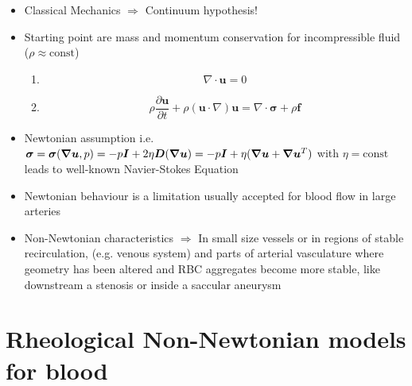 \documentclass{beamer}
\begin{document}
	
	    \begin{frame}
	    \begin{itemize}
	        \item        Classical Mechanics
			    $\Rightarrow$ Continuum hypothesis!
			    \item Starting point are mass and momentum conservation for incompressible fluid ($\rho \approx \text{const}$) 
	    \begin{enumerate}
			    \item \begin{equation*}
			         \nabla \cdot \bm{u} = 0
			    \end{equation*}
			      \item \begin{equation*}
			         \rho  \frac{\partial \bm{u}}{\partial t} + \rho (\bm{u} \cdot \nabla) \bm{u} =  \nabla \cdot \bm{\sigma} + \rho\bm{f}
			    \end{equation*}
			    \end{enumerate}	
			    \vspace{5pt}
			    \item Newtonian assumption i.e. $
    \bm{\sigma} = \bm{\sigma}(\grad\bm{u},p)= -p\bm{I} +2\eta\bm{D}(\grad\bm{u})= -p\bm{I} + \eta(\grad\bm{u}+\grad\bm{u}^T)$
    with $\eta = \text{const}$ leads to well-known Navier-Stokes Equation
	    \end{itemize}
		    \end{frame}

	
	    \begin{frame}
	    \begin{itemize}
        \item Newtonian behaviour is a limitation usually accepted for blood flow in large arteries
        \item Non-Newtonian
characteristics $\Rightarrow$ In small size vessels or in regions of stable recirculation, (e.g. venous system) and parts of  arterial vasculature where geometry has been altered and RBC aggregates become more stable,
like downstream a stenosis or inside a saccular aneurysm
	    \end{itemize}
		    \end{frame}
	
	\section[Non-Newtonian Models]{Rheological Non-Newtonian models for blood}	
	
\end{document}
